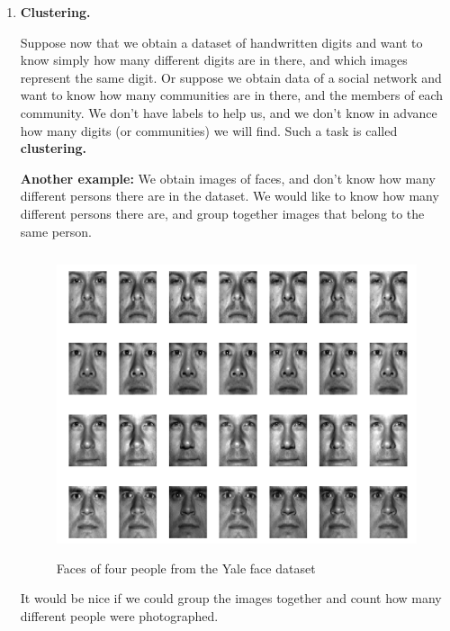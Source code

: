 \documentclass[11pt]{article}
\begin{document}
\begin{enumerate}
  \item {\bf Clustering.}

    Suppose now that we obtain a dataset of handwritten digits and want to know
    simply how many different digits are in there, and which images represent
    the same digit. Or suppose we obtain data of a social network and want to
    know how many communities are in there, and the members of each community.
    We don't have labels to help us, and we don't know in advance how many
    digits (or communities) we will find. Such a task is called {\bf
    clustering.} 

    {\bf Another example:} We obtain images of faces, and don't know how many
    different persons there are in the dataset. We would like to know how many
    different persons there are, and group together images that belong to the
    same person. 
    
    \begin{figure}[H]
      \centering
      \includegraphics[height=3.5in]{pca_faces_before.jpeg}        
      \caption{Faces of four people from the Yale face dataset}
    \end{figure}

    It would be nice if we could group the images together and count how many
    different people were photographed. 


\end{enumerate}
\end{document}
